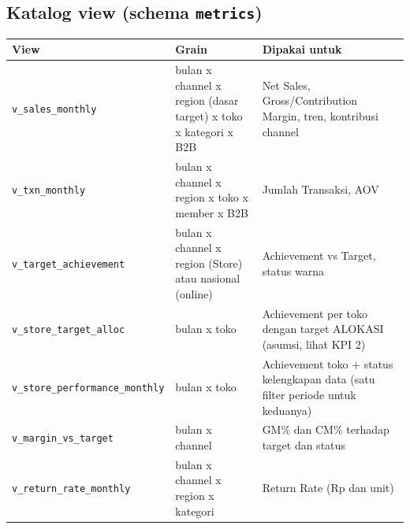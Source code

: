 \documentclass[10pt,a4paper]{article}
\begin{document}
\subsection{\texorpdfstring{Katalog view (schema \texttt{metrics})}{Katalog view (schema metrics)}}\label{katalog-view-schema-metrics}

{\def\LTcaptype{none} %
\begin{longtable}[]{@{}
  >{\raggedright\arraybackslash}p{}
  >{\raggedright\arraybackslash}p{}
  >{\raggedright\arraybackslash}p{}@{}}
\toprule\noalign{}
\begin{minipage}[b]{\linewidth}\raggedright
View
\end{minipage} & \begin{minipage}[b]{\linewidth}\raggedright
Grain
\end{minipage} & \begin{minipage}[b]{\linewidth}\raggedright
Dipakai untuk
\end{minipage} \\
\midrule\noalign{}
\endhead
\bottomrule\noalign{}
\endlastfoot
\texttt{v\_\allowbreak{}sales\_\allowbreak{}monthly} & bulan x channel x region (dasar target) x toko x kategori x B2B & Net Sales, Gross/Contribution Margin, tren, kontribusi channel \\
\texttt{v\_\allowbreak{}txn\_\allowbreak{}monthly} & bulan x channel x region x toko x member x B2B & Jumlah Transaksi, AOV \\
\texttt{v\_\allowbreak{}target\_\allowbreak{}achievement} & bulan x channel x region (Store) atau nasional (online) & Achievement vs Target, status warna \\
\texttt{v\_\allowbreak{}store\_\allowbreak{}target\_\allowbreak{}alloc} & bulan x toko & Achievement per toko dengan target ALOKASI (asumsi, lihat KPI 2) \\
\texttt{v\_\allowbreak{}store\_\allowbreak{}performance\_\allowbreak{}monthly} & bulan x toko & Achievement toko + status kelengkapan data (satu filter periode untuk keduanya) \\
\texttt{v\_\allowbreak{}margin\_\allowbreak{}vs\_\allowbreak{}target} & bulan x channel & GM\% dan CM\% terhadap target dan status \\
\texttt{v\_\allowbreak{}return\_\allowbreak{}rate\_\allowbreak{}monthly} & bulan x channel x region x kategori & Return Rate (Rp dan unit) \\

\end{longtable}}
\end{document}
